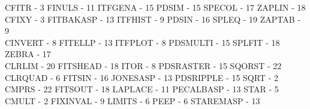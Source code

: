 {\begin{tabbing}
 CFITR - 3                               \>FINULS - 11                           
   \>ITFGENA - 15                            \>
 PDSIM - 15                              \>SPECOL - 17                           
   \>ZAPLIN - 18                             \\
 CFIXY - 3                               \>FITBAKASP - 13                        
   \>ITFHIST - 9                             \>
 PDSIN - 16                              \>SPLEQ - 19                            
   \>ZAPTAB - 9                              \\
 CINVERT - 8                             \>FITELLP - 13                          
   \>ITFPLOT - 8                             \>
 PDSMULTI - 15                           \>SPLFIT - 18                           
   \>ZEBRA - 17                              \\
 CLRLIM - 20                             \>FITSHEAD - 18                         
   \>ITOR - 8                                \>
 PDSRASTER - 15                          \>SQORST - 22                           
   \\
 CLRQUAD - 6                             \>FITSIN - 16                           
   \>JONESASP - 13                           \>
 PDSRIPPLE - 15                          \>SQRT - 2                              
   \\
 CMPRS - 22                              \>FITSOUT - 18                          
   \>LAPLACE - 11                            \>
 PECALBASP - 13                          \>STAR - 5                              
   \\
 CMULT - 2                               \>FIXINVAL - 9                          
   \>LIMITS - 6                              \>
 PEEP - 6                                \>STAREMASP - 13                        
   \\
\end{tabbing}}

